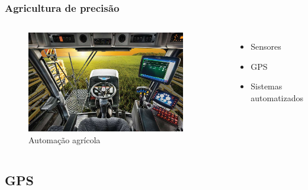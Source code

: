 \begin{frame}
\frametitle{Agricultura de precisão}
\begin{columns}

	\begin{figure}[]
	 \centering
	 \captionsetup{width=0.9\textwidth,font=footnotesize,textfont=bf}
	 \includegraphics[width=0.9\textwidth,keepaspectratio]{Figuras/auto.jpg}
	 \caption{Automação agrícola}
	\end{figure}
	
	\begin{itemize}
	\item Sensores
	\item GPS
	\item Sistemas automatizados
	\end{itemize}

\end{columns}

\end{frame}

\subsection{GPS}

